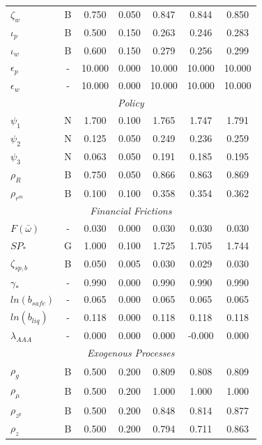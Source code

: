 \documentclass[12pt]{article}
\begin{document}
{\begin{longtable}{lcccccc}
$\zeta_w$ & B &    0.750 &    0.050 &    0.847 &    0.844 &    0.850 \\
$\iota_p$ & B &    0.500 &    0.150 &    0.263 &    0.246 &    0.283 \\
$\iota_w$ & B &    0.600 &    0.150 &    0.279 &    0.256 &    0.299 \\
$\epsilon_{p}$ & - &   10.000 &    0.000 &   10.000 &   10.000 &   10.000 \\
$\epsilon_{w}$ & - &   10.000 &    0.000 &   10.000 &   10.000 &   10.000 \\
\multicolumn{7}{c}{\textit{Policy}} \\[3pt]
$\psi_1$ & N &    1.700 &    0.100 &    1.765 &    1.747 &    1.791 \\
$\psi_2$ & N &    0.125 &    0.050 &    0.249 &    0.236 &    0.259 \\
$\psi_3$ & N &    0.063 &    0.050 &    0.191 &    0.185 &    0.195 \\
$\rho_R$ & B &    0.750 &    0.050 &    0.866 &    0.863 &    0.869 \\
$\rho_{r^m}$ & B &    0.100 &    0.100 &    0.358 &    0.354 &    0.362 \\
\multicolumn{7}{c}{\textit{Financial Frictions}} \\[3pt]
$F(\bar{\omega})$ & - &    0.030 &    0.000 &    0.030 &    0.030 &    0.030 \\
$SP_*$ & G &    1.000 &    0.100 &    1.725 &    1.705 &    1.744 \\
$\zeta_{sp,b}$ & B &    0.050 &    0.005 &    0.030 &    0.029 &    0.030 \\
$\gamma_*$ & - &    0.990 &    0.000 &    0.990 &    0.990 &    0.990 \\
$ln(b_{safe})$ & - &    0.065 &    0.000 &    0.065 &    0.065 &    0.065 \\
$ln(b_{liq})$ & - &    0.118 &    0.000 &    0.118 &    0.118 &    0.118 \\
$\lambda_{AAA}$ & - &    0.000 &    0.000 &    0.000 &   -0.000 &    0.000 \\
\multicolumn{7}{c}{\textit{Exogenous Processes}} \\[3pt]
$\rho_g$ & B &    0.500 &    0.200 &    0.809 &    0.808 &    0.809 \\
$\rho_{\mu}$ & B &    0.500 &    0.200 &    1.000 &    1.000 &    1.000 \\
$\rho_{z^p}$ & B &    0.500 &    0.200 &    0.848 &    0.814 &    0.877 \\
$\rho_z$ & B &    0.500 &    0.200 &    0.794 &    0.711 &    0.863 \\

\end{longtable}}
\end{document}
